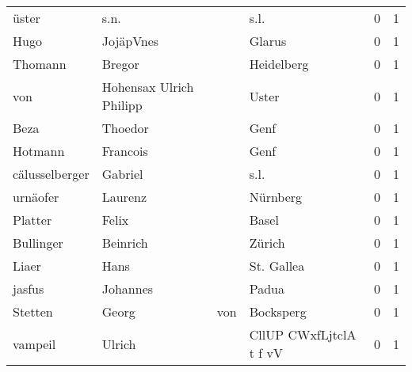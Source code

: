 \begin{tabular}{llllrr}
                    üster &                               s.n. &             &                                        s.l. &          0 &         1 \\
                     Hugo &                          JojäpVnes &             &                                      Glarus &          0 &         1 \\
                  Thomann &                             Bregor &             &                                  Heidelberg &          0 &         1 \\
                      von &            Hohensax Ulrich Philipp &             &                                       Uster &          0 &         1 \\
                     Beza &                            Thoedor &             &                                        Genf &          0 &         1 \\
                  Hotmann &                           Francois &             &                                        Genf &          0 &         1 \\
           cälusselberger &                            Gabriel &             &                                        s.l. &          0 &         1 \\
                 urnäofer &                            Laurenz &             &                                    Nürnberg &          0 &         1 \\
                  Platter &                              Felix &             &                                       Basel &          0 &         1 \\
                Bullinger &                           Beinrich &             &                                      Zürich &          0 &         1 \\
                    Liaer &                               Hans &             &                                  St. Gallea &          0 &         1 \\
                   jasfus &                           Johannes &             &                                       Padua &          0 &         1 \\
                  Stetten &                              Georg &         von &                                   Bocksperg &          0 &         1 \\
                  vampeil &                             Ulrich &             &                     CllUP CWxfLjtclA t f vV &          0 &         1 \\

\end{tabular}
